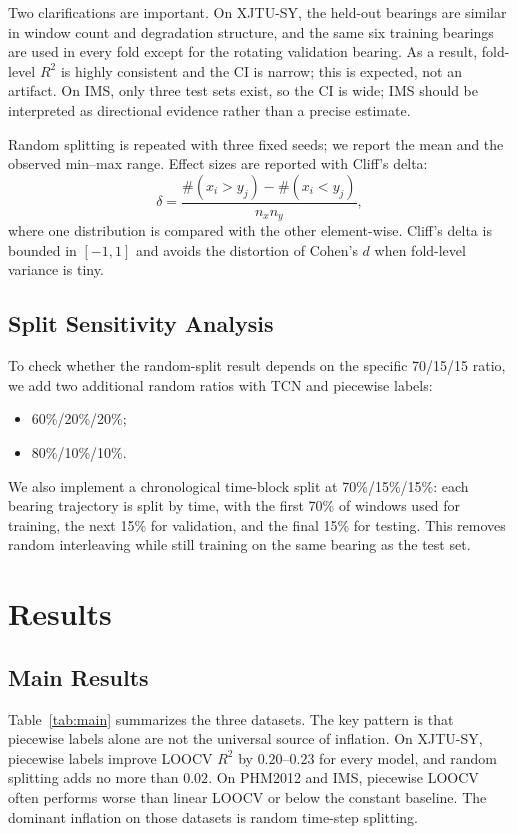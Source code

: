 \documentclass[5p,twocolumn]{elsarticle}
\begin{document}
Two clarifications are important. On XJTU-SY, the held-out bearings are similar in window count and degradation structure, and the same six training bearings are used in every fold except for the rotating validation bearing. As a result, fold-level $R^2$ is highly consistent and the CI is narrow; this is expected, not an artifact. On IMS, only three test sets exist, so the CI is wide; IMS should be interpreted as directional evidence rather than a precise estimate.

Random splitting is repeated with three fixed seeds; we report the mean and the observed min--max range. Effect sizes are reported with Cliff's delta:
\begin{equation}
\delta = \frac{\#(x_i > y_j) - \#(x_i < y_j)}{n_x n_y},
\label{eq:cliff}
\end{equation}
where one distribution is compared with the other element-wise. Cliff's delta is bounded in $[-1, 1]$ and avoids the distortion of Cohen's $d$ when fold-level variance is tiny.

\subsection{Split Sensitivity Analysis}
To check whether the random-split result depends on the specific 70/15/15 ratio, we add two additional random ratios with TCN and piecewise labels:
\begin{itemize}
    \item 60\%/20\%/20\%;
    \item 80\%/10\%/10\%.
\end{itemize}
We also implement a chronological time-block split at 70\%/15\%/15\%: each bearing trajectory is split by time, with the first 70\% of windows used for training, the next 15\% for validation, and the final 15\% for testing. This removes random interleaving while still training on the same bearing as the test set.

\section{Results}
\subsection{Main Results}
Table~\ref{tab:main} summarizes the three datasets. The key pattern is that piecewise labels alone are not the universal source of inflation. On XJTU-SY, piecewise labels improve LOOCV $R^2$ by $0.20$--$0.23$ for every model, and random splitting adds no more than $0.02$. On PHM2012 and IMS, piecewise LOOCV often performs worse than linear LOOCV or below the constant baseline. The dominant inflation on those datasets is random time-step splitting.
\end{document}
